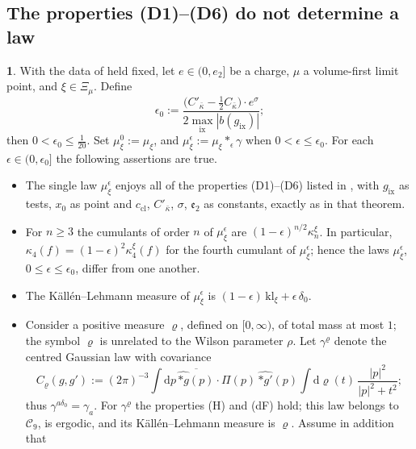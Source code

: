 \documentclass[11pt]{amsart}
\newcommand{\namedhead}{}
\theoremstyle{definition}
\newtheorem*{namedinner}{\namedhead}
\newenvironment{named}[1]{\renewcommand{\namedhead}{#1}\begin{namedinner}}{\end{namedinner}}
\begin{document}
\subsection{The properties (D1)--(D6) do not determine a law}

\begin{named}{Proposition 4.4}
With the data of \cite[Theorem~44]{QEDIII} held fixed, let $e\in(0,e_2]$ be a charge, $\mu$ a volume-first limit point, and $\xi\in\Xi_\mu$.
Define
\begin{equation*}
\epsilon_0:=\frac{\bigl(C'_{\bar\kappa}-\frac12C_{\bar\kappa}\bigr)\cdot e^{\sigma}}{2\max_{\mathrm{ix}}|b(g_{\mathrm{ix}})|};
\end{equation*}
then $0<\epsilon_0\le\frac1{20}$.
Set $\mu_\xi^{0}:=\mu_\xi$, and $\mu_\xi^{\epsilon}:=\mu_\xi\ast_\epsilon\gamma$ when $0<\epsilon\le\epsilon_0$.
For each $\epsilon\in(0,\epsilon_0]$ the following assertions are true.
\begin{itemize}
\item[(a)] The single law $\mu_\xi^\epsilon$ enjoys all of the properties (D1)--(D6) listed in \cite[Theorem~44]{QEDIII}, with $g_{\mathrm{ix}}$ as tests, $x_0$ as point and $c_{\mathrm{cl}}$, $C'_{\bar\kappa}$, $\sigma$, $\mathfrak e_2$ as constants, exactly as in that theorem.
\item[(b)] For $n\ge3$ the cumulants of order $n$ of $\mu_\xi^\epsilon$ are $(1-\epsilon)^{n/2}\kappa_n^\xi$.
In particular, $\kappa_4(f)=(1-\epsilon)^2\kappa_4^\xi(f)$ for the fourth cumulant of $\mu_\xi^\epsilon$; hence the laws $\mu_\xi^\epsilon$, $0\le\epsilon\le\epsilon_0$, differ from one another.
\item[(c)] The K\"all\'en--Lehmann measure of $\mu_\xi^\epsilon$ is $(1-\epsilon)\,\mathrm{kl}_\xi+\epsilon\,\delta_0$.
\item[(d)] Consider a positive measure $\varrho$, defined on $[0,\infty)$, of total mass at most $1$; the symbol $\varrho$ is unrelated to the Wilson parameter $\rho$.
Let $\gamma^\varrho$ denote the centred Gaussian law with covariance
\begin{equation*}
C_\varrho(g,g'):=(2\pi)^{-3}\int\mathrm dp\,\overline{\widehat{\ast g}(p)}\cdot\Pi(p)\,\widehat{\ast g'}(p)\int\mathrm d\varrho(t)\,\frac{|p|^2}{|p|^2+t^2};
\end{equation*}
thus $\gamma^{a\delta_0}=\gamma_a$.
For $\gamma^\varrho$ the properties (H) and (dF) hold; this law belongs to $\mathcal C_9$, is ergodic, and its K\"all\'en--Lehmann measure is $\varrho$.
Assume in addition that
\begin{equation*}

\end{equation*}
\end{itemize}
\end{named}
\end{document}
